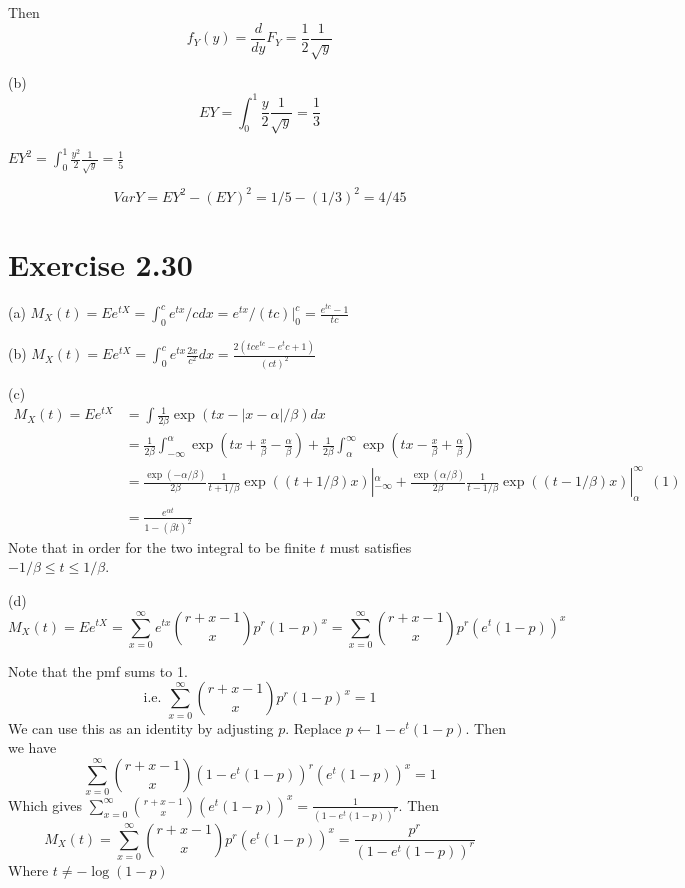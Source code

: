 \documentclass[12pt]{article}
\begin{document}
Then $$f_Y(y) = \frac{d}{dy}F_Y = \frac{1}{2}\frac{1}{\sqrt{y}}$$

(b) $$EY = \int^{1}_{0} \frac{y}{2}\frac{1}{\sqrt{y}} = \frac{1}{3}$$

$EY^2 = \int^1_0 \frac{y^2}{2} \frac{1}{\sqrt{y}} = \frac{1}{5}$

$$VarY = EY^2 - (EY)^2 = 1/5 - (1/3)^2 = 4/45 $$

\section*{Exercise 2.30}
(a) $M_X(t) = Ee^{tX} = \int_0^c e^{tx} /c dx =  e^{tx}/(tc)|^c_0 = \frac{e^{tc} - 1}{tc}$

(b) $M_X(t) = Ee^{tX} = \int_0^c e^{tx} \frac{2x}{c^2} dx = \frac{2(tce^{tc}-e^tc+1)}{(ct)^2} $

(c) $$\begin{aligned}
M_X(t)= Ee^{tX} &= \int \frac{1}{2\beta} \exp(tx - |x-\alpha|/\beta) dx \\
             &=\frac{1}{2\beta} \int_{-\infty}^{\alpha} \exp(tx + \frac{x}{\beta} - \frac{\alpha}{\beta})
             + \frac{1}{2\beta} \int_{\alpha}^{\infty} \exp(tx - \frac{x}{\beta} + \frac{\alpha}{\beta}) \\
             &=\frac{\exp(- \alpha/\beta)}{2\beta} \frac{1}{t+1/\beta}\exp((t +1/\beta)x) |_{-\infty}^{\alpha} + 
             \frac{\exp(\alpha/\beta)}{2\beta} \frac{1}{t -1/\beta}\exp((t -1/\beta)x) |^{\infty}_{\alpha} \ \ (1) \\
             &= \frac{e^{\alpha t}}{1-(\beta t)^2}
\end{aligned}
$$
Note that in order for the two integral to be finite $t$ must satisfies $-1/\beta \leq t \leq 1/\beta$.

(d) $$M_X(t) = Ee^{tX} = \sum_{x=0}^{\infty} e^{tx} {r+x-1 \choose x} p^r(1-p)^x = \sum_{x=0}^{\infty} {r+x-1 \choose x} p^r(e^{t}(1-p))^x $$

Note that the pmf sums to 1. $$\mbox{i.e.   } \sum_{x=0}^{\infty}{r+x-1 \choose x} p^r(1-p)^x = 1$$ 
We can use this as an identity by adjusting $p$. Replace $p \leftarrow 1 - e^t(1-p)$. Then we have
$$\sum_{x=0}^{\infty}{r+x-1 \choose x}( 1 - e^t(1-p))^r(e^t(1-p))^x = 1$$
Which gives $\sum_{x=0}^{\infty}{r+x-1 \choose x}(e^t(1-p))^x = \frac{1}{( 1 - e^t(1-p))^r}$.
Then $$M_X(t) = \sum_{x=0}^{\infty} {r+x-1 \choose x} p^r(e^{t}(1-p))^x =  \frac{p^r}{( 1 - e^t(1-p))^r}$$
Where $t \neq -\log(1-p)$
\end{document}
